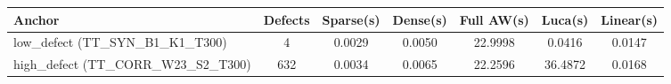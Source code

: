 \begin{tabular}{lcccccc}
\toprule
Anchor & Defects & Sparse(s) & Dense(s) & Full AW(s) & Luca(s) & Linear(s) \\
\midrule
low\_defect (TT\_SYN\_B1\_K1\_T300) & 4 & 0.0029 & 0.0050 & 22.9998 & 0.0416 & 0.0147 \\
high\_defect (TT\_CORR\_W23\_S2\_T300) & 632 & 0.0034 & 0.0065 & 22.2596 & 36.4872 & 0.0168 \\
\bottomrule
\end{tabular}
